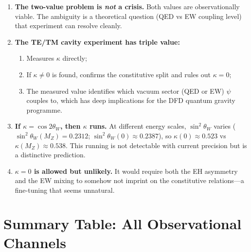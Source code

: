 \documentclass[11pt,a4paper]{article}
\theoremstyle{definition}
\begin{document}
\begin{enumerate}
\item \textbf{The two-value problem is \emph{not} a crisis.}
  Both values are observationally viable.  The ambiguity is
  a theoretical question (QED vs EW coupling level) that
  experiment can resolve cleanly.

\item \textbf{The TE/TM cavity experiment has triple value:}
  \begin{enumerate}
  \item Measures $\kappa$ directly;
  \item If $\kappa \neq 0$ is found, confirms the constitutive
    split and rules out $\kappa = 0$;
  \item The measured value identifies which vacuum sector
    (QED or EW) $\psi$ couples to, which has deep implications
    for the DFD quantum gravity programme.
  \end{enumerate}

\item \textbf{If $\kappa = \cos 2\theta_W$, then $\kappa$ runs.}
  At different energy scales, $\sin^2\theta_W$ varies
  ($\sin^2\theta_W(M_Z) = 0.2312$;
  $\sin^2\theta_W(0) \approx 0.2387$), so
  $\kappa(0) \approx 0.523$ vs $\kappa(M_Z) \approx 0.538$.
  This running is not detectable with current precision but
  is a distinctive prediction.

\item \textbf{$\kappa = 0$ is allowed but unlikely.}
  It would require both the EH asymmetry and the EW mixing
  to somehow not imprint on the constitutive relations---a
  fine-tuning that seems unnatural.
\end{enumerate}


\section{Summary Table: All Observational Channels}
\label{sec:summary}
\end{document}
